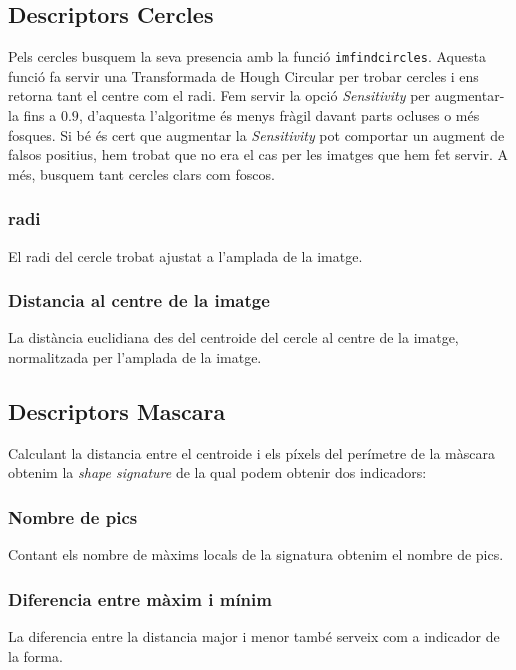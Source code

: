
\subsection{Descriptors Cercles}

Pels cercles busquem la seva presencia amb la funció \texttt{imfindcircles}.
Aquesta funció fa servir una Transformada de Hough Circular per trobar cercles
i ens retorna tant el centre com el radi. Fem servir la opció \emph{Sensitivity}
per augmentar-la fins a $0.9$, d'aquesta l'algoritme és menys fràgil davant
parts ocluses o més fosques. Si bé és cert que augmentar la \emph{Sensitivity}
pot comportar un augment de falsos positius, hem trobat que no era el cas per
les imatges que hem fet servir. A més, busquem tant cercles clars com foscos.

\subsubsection{radi}

El radi del cercle trobat ajustat a l'amplada de la imatge.

\subsubsection{Distancia al centre de la imatge}

La distància euclidiana des del centroide del cercle al centre de la imatge,
normalitzada per l'amplada de la imatge.

\subsection{Descriptors Mascara}

Calculant la distancia entre el centroide i els píxels del perímetre de la màscara
obtenim la
\emph{shape signature} de la qual podem obtenir dos indicadors:

\subsubsection{Nombre de pics}
Contant els nombre de màxims locals de la signatura obtenim el nombre de pics.

\subsubsection{Diferencia entre màxim i mínim}
La diferencia entre la distancia major i menor també serveix com a indicador de la forma.

